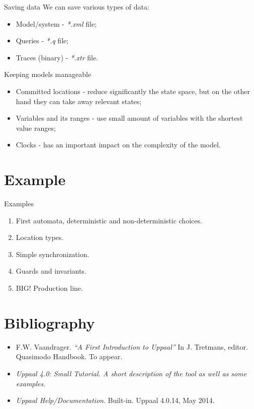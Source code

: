 \documentclass{beamer}
\begin{document}
\begin{frame}{Saving data}
	We can save various types of data:
	
	\begin{itemize}
		\item Model/system - \textit{*.xml} file;
		\item Queries - \textit{*.q} file;
		\item Traces (binary) - \textit{*.xtr} file.
	\end{itemize}
\end{frame}

\begin{frame}{Keeping models manageable}
	\begin{itemize}
		\item Committed locations - reduce significantly the state space, but on the other hand they can take away relevant states;
		\item Variables and its ranges - use small amount of variables with the shortest value ranges;
		\item Clocks - has an important impact on the complexity of the model.
	\end{itemize}
\end{frame}

\section{Example}

\begin{frame}{Examples}
	\begin{enumerate}
		\item First automata, deterministic and non-deterministic choices.
		\item Location types.
		\item Simple synchronization.
		\item Guards and invariants.
		\item BIG! Production line.
	\end{enumerate}
\end{frame}

\section{Bibliography}

\begin{frame}
	\begin{itemize}
		\item F.W. Vaandrager. \textit{``A First Introduction to Uppaal''} In J. Tretmans, editor. Quasimodo Handbook. To appear.
		\item \textit{Uppaal 4.0: Small Tutorial. A short description of the tool as well as some examples.}
		\item \textit{Uppaal Help/Documentation}. Built-in. Uppaal 4.0.14, May 2014.
	\end{itemize}
\end{frame}
\end{document}
